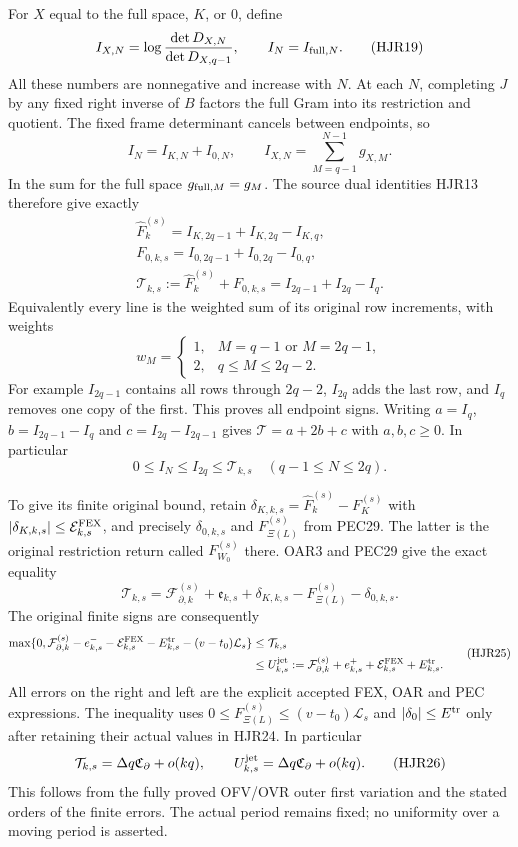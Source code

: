 \documentclass[11pt,a4paper]{article}
\begin{document}
For $X$ equal to the full space, $K$, or $0$, define
\[
 I_{X,N}=\log\frac{\det D_{X,N}}{\det D_{X,q-1}},
 \qquad I_N=I_{{\rm full},N}.
 \tag{HJR19}
\]
All these numbers are nonnegative and increase with $N$.
At each $N$, completing $J$ by any fixed right inverse of
$B$ factors the full Gram into its restriction and quotient.
The fixed frame determinant cancels between endpoints, so
\[
 I_N=I_{K,N}+I_{0,N},\qquad
 I_{X,N}=\sum_{M=q-1}^{N-1}g_{X,M}.
 \tag{HJR20}
\]
In the sum for the full space $g_{{\rm full},M}=g_M$.
The source dual identities HJR13 therefore give exactly
\[
 \begin{gathered}
 \widehat F_k^{(s)}
       =I_{K,2q-1}+I_{K,2q}-I_{K,q},\\
 F_{0,k,s}=I_{0,2q-1}+I_{0,2q}-I_{0,q},\\
 \mathcal T_{k,s}:=\widehat F_k^{(s)}+F_{0,k,s}
       =I_{2q-1}+I_{2q}-I_q.
 \end{gathered}\tag{HJR21}
\]
Equivalently every line is the weighted sum of its original
row increments, with weights
\[
 w_M=
 \begin{cases}
 1,&M=q-1\text{ or }M=2q-1,\\
 2,&q\le M\le2q-2.
 \end{cases}
 \tag{HJR22}
\]
For example $I_{2q-1}$ contains all rows through $2q-2$,
$I_{2q}$ adds the last row, and $I_q$ removes one copy of
the first. This proves all endpoint signs.
Writing $a=I_q$, $b=I_{2q-1}-I_q$ and
$c=I_{2q}-I_{2q-1}$ gives
$\mathcal T=a+2b+c$ with $a,b,c\ge0$. In particular
\[
 0\le I_N\le I_{2q}\le\mathcal T_{k,s}
                         \quad(q-1\le N\le2q).
 \tag{HJR23}
\]

To give its finite original bound, retain
$\delta_{K,k,s}=\widehat F_k^{(s)}-F_K^{(s)}$ with
$|\delta_{K,k,s}|\le\mathcal E_{k,s}^{\rm FEX}$,
and precisely $\delta_{0,k,s}$ and $F_{\Xi(L)}^{(s)}$
from PEC29. The latter is the original restriction return
called $F_{W_0}^{(s)}$ there.
OAR3 and PEC29 give the exact equality
\[
 \mathcal T_{k,s}
 =\mathcal F_{\partial,k}^{(s)}
    +\mathfrak e_{k,s}+\delta_{K,k,s}
            -F_{\Xi(L)}^{(s)}-\delta_{0,k,s}.
 \tag{HJR24}
\]
The original finite signs are consequently
\[
 \begin{split}
 \max\{0,\mathcal F_{\partial,k}^{(s)}
       -e_{k,s}^--\mathcal E_{k,s}^{\rm FEX}
       -E_{k,s}^{\rm tr}-(v-t_0)\mathcal L_s\}
 &\le\mathcal T_{k,s}\\
 &\le U_{k,s}^{\rm jet}
 :=\mathcal F_{\partial,k}^{(s)}
       +e_{k,s}^++\mathcal E_{k,s}^{\rm FEX}+E_{k,s}^{\rm tr}.
 \end{split}\tag{HJR25}
\]
All errors on the right and left are the explicit accepted
FEX, OAR and PEC expressions. The inequality uses
$0\le F_{\Xi(L)}^{(s)}\le(v-t_0)\mathcal L_s$ and
$|\delta_0|\le E^{\rm tr}$ only after retaining their
actual values in HJR24. In particular
\[
 \mathcal T_{k,s}
       =\Delta q\mathfrak C_\partial+o(kq),\qquad
 U_{k,s}^{\rm jet}
       =\Delta q\mathfrak C_\partial+o(kq).
 \tag{HJR26}
\]
This follows from the fully proved OFV/OVR outer first
variation and the stated orders of the finite errors.
The actual period remains fixed; no uniformity over a
moving period is asserted.
\end{document}
